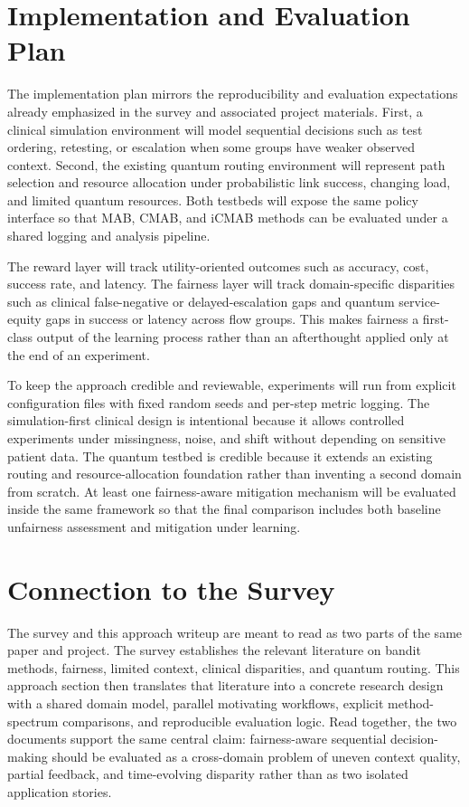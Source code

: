 \documentclass{IEEEtran}
\begin{document}
\section{Implementation and Evaluation Plan}
The implementation plan mirrors the reproducibility and evaluation expectations already
emphasized in the survey and associated project materials. First, a clinical simulation
environment will model sequential decisions such as test ordering, retesting, or escalation
when some groups have weaker observed context. Second, the existing quantum routing
environment will represent path selection and resource allocation under probabilistic link
success, changing load, and limited quantum resources. Both testbeds will expose the same
policy interface so that MAB, CMAB, and iCMAB methods can be evaluated under a shared
logging and analysis pipeline.

The reward layer will track utility-oriented outcomes such as accuracy, cost, success rate, and
latency. The fairness layer will track domain-specific disparities such as clinical false-negative
or delayed-escalation gaps and quantum service-equity gaps in success or latency across flow
groups. This makes fairness a first-class output of the learning process rather than an
afterthought applied only at the end of an experiment.

To keep the approach credible and reviewable, experiments will run from explicit
configuration files with fixed random seeds and per-step metric logging. The simulation-first
clinical design is intentional because it allows controlled experiments under missingness,
noise, and shift without depending on sensitive patient data. The quantum testbed is
credible because it extends an existing routing and resource-allocation foundation rather than
inventing a second domain from scratch. At least one fairness-aware mitigation mechanism
will be evaluated inside the same framework so that the final comparison includes both
baseline unfairness assessment and mitigation under learning.

\section{Connection to the Survey}
The survey and this approach writeup are meant to read as two parts of the same paper and
project. The survey establishes the relevant literature on bandit methods, fairness, limited
context, clinical disparities, and quantum routing. This approach section then translates that
literature into a concrete research design with a shared domain model, parallel motivating
workflows, explicit method-spectrum comparisons, and reproducible evaluation logic. Read
together, the two documents support the same central claim: fairness-aware sequential
decision-making should be evaluated as a cross-domain problem of uneven context quality,
partial feedback, and time-evolving disparity rather than as two isolated application stories.
\end{document}

